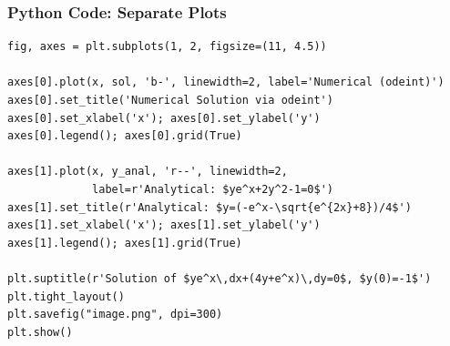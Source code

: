 \documentclass{beamer}
\begin{document}
\begin{frame}[fragile]
\frametitle{Python Code: Separate Plots}
\begin{lstlisting}
fig, axes = plt.subplots(1, 2, figsize=(11, 4.5))

axes[0].plot(x, sol, 'b-', linewidth=2, label='Numerical (odeint)')
axes[0].set_title('Numerical Solution via odeint')
axes[0].set_xlabel('x'); axes[0].set_ylabel('y')
axes[0].legend(); axes[0].grid(True)

axes[1].plot(x, y_anal, 'r--', linewidth=2,
             label=r'Analytical: $ye^x+2y^2-1=0$')
axes[1].set_title(r'Analytical: $y=(-e^x-\sqrt{e^{2x}+8})/4$')
axes[1].set_xlabel('x'); axes[1].set_ylabel('y')
axes[1].legend(); axes[1].grid(True)

plt.suptitle(r'Solution of $ye^x\,dx+(4y+e^x)\,dy=0$, $y(0)=-1$')
plt.tight_layout()
plt.savefig("image.png", dpi=300)
plt.show()
\end{lstlisting}
\end{frame}
\end{document}
